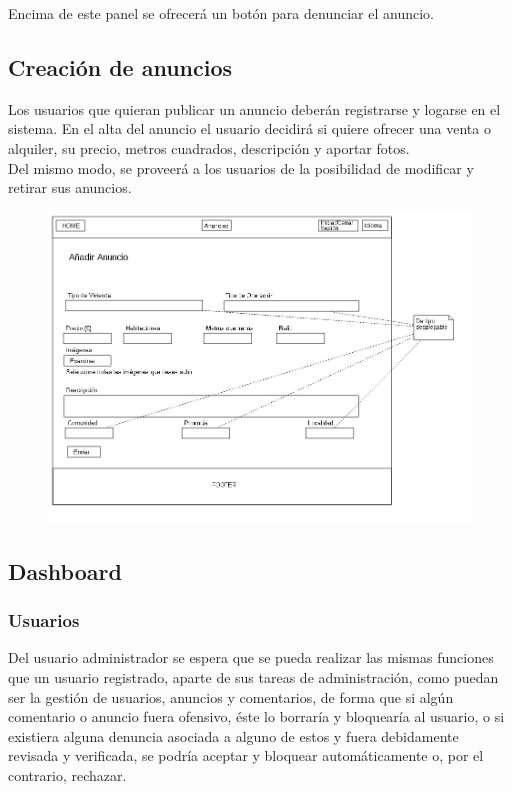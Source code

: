 Encima de este panel se ofrecer\'{a} un bot\'{o}n para denunciar el anuncio.



\subsection{Creaci\'{o}n de anuncios}



Los usuarios que quieran publicar un anuncio deber\'{a}n registrarse y logarse en el sistema. 
En el alta del anuncio el usuario decidir\'{a} si quiere ofrecer una venta o alquiler, su precio, metros cuadrados, descripci\'{o}n y aportar fotos. \\

Del mismo modo, se proveer\'{a} a los usuarios de la posibilidad de modificar y retirar sus anuncios. 


\begin{figure}[h!]
\centering
\includegraphics[width=1.1\textwidth]{Img/VisionAplicacion/vision_7.jpg}
\end{figure}


\subsection{Dashboard}
\subsubsection{Usuarios}
Del usuario administrador se espera que se pueda realizar las mismas funciones que un usuario registrado, aparte de sus tareas de administraci\'{o}n, como puedan ser la gesti\'{o}n de usuarios, anuncios y comentarios, de forma que si alg\'{u}n comentario o anuncio fuera ofensivo, \'{e}ste lo borrar\'{i}a y bloquear\'{i}a al usuario, o si existiera alguna denuncia asociada a alguno de estos y fuera debidamente revisada y verificada, se podr\'{i}a aceptar y bloquear autom\'{a}ticamente o, por el contrario, rechazar.

